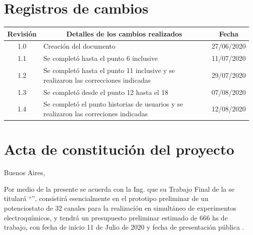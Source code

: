 \documentclass[11pt]{charter}
\begin{document}
\maketitle
\thispagestyle{empty}
\pagebreak


\thispagestyle{empty}
{\setlength{\parskip}{0pt}
\tableofcontents{}
}
\pagebreak


\section{Registros de cambios}
\label{sec:registro}


\begin{table}[ht]
\label{tab:registro}
\centering

\begin{tabularx}{\linewidth}{@{}|c|X|c|@{}}
\hline
\rowcolor[HTML]{C0C0C0} 
Revisión & \multicolumn{1}{c|}{\cellcolor[HTML]{C0C0C0}Detalles de los cambios realizados} & Fecha      \\ \hline
1.0      & Creación del documento     & 27/06/2020 \\ \hline
1.1      & Se completó hasta el punto 6 inclusive  & 11/07/2020  \\ \hline
1.2      & Se completó hasta el punto 11 inclusive y se realizaron las correcciones indicadas                  & 29/07/2020\\ \hline
1.3      & Se completó desde el punto 12 hasta el 18   & 07/08/2020\\ \hline
1.4      & Se completó el punto historias de usuarios y se realizaron las correciones indicadas  & 12/08/2020\\ \hline
\end{tabularx}
\end{table}

\pagebreak



\section{Acta de constitución del proyecto}
\label{sec:acta}

\begin{flushright}
Buenos Aires, \fechaInicioName
\end{flushright}

\vspace{2cm}

Por medio de la presente se acuerda con la Ing. \authorname\hspace{1px} que su Trabajo Final de la \degreename\hspace{1px} se titulará ``\ttitle'', consistirá esencialmente en el prototipo preliminar de un potenciostato de 32 canales para la realización en simultáneo de experimentos electroquímicos, y tendrá un presupuesto preliminar estimado de 666 hs de trabajo, con fecha de inicio 11 de Julio de 2020\hspace{1px} y fecha de presentación pública \fechaFinalName.
\end{document}
